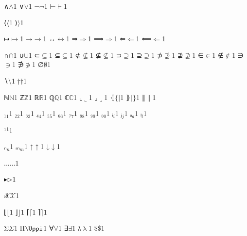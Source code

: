 {{∧}{{\ensuremath{\wedge}}}1
{∨}{{\ensuremath{\vee}}}1
{¬}{{\ensuremath{\neg}}}1
{⊢}{{\ensuremath{\vdash}}}1

{⟨}{{\ensuremath{\langle}}}1
{⟩}{{\ensuremath{\rangle}}}1

{↦}{{\ensuremath{\mapsto}}}1
{→}{{\ensuremath{\rightarrow}}}1
{↔}{{\ensuremath{\leftrightarrow}}}1
{⇒}{{\ensuremath{\Rightarrow}}}1
{⟹}{{\ensuremath{\Longrightarrow}}}1
{⇐}{{\ensuremath{\Leftarrow}}}1
{⟸}{{\ensuremath{\Longleftarrow}}}1

{∩}{{\ensuremath{\cap}}}1
{∪}{{\ensuremath{\cup}}}1
{⊂}{{\ensuremath{\subseteq}}}1
{⊆}{{\ensuremath{\subseteq}}}1
{⊄}{{\ensuremath{\nsubseteq}}}1
{⊈}{{\ensuremath{\nsubseteq}}}1
{⊃}{{\ensuremath{\supseteq}}}1
{⊇}{{\ensuremath{\supseteq}}}1
{⊅}{{\ensuremath{\nsupseteq}}}1
{⊉}{{\ensuremath{\nsupseteq}}}1
{∈}{{\ensuremath{\in}}}1
{∉}{{\ensuremath{\notin}}}1
{∋}{{\ensuremath{\ni}}}1
{∌}{{\ensuremath{\notni}}}1
{∅}{{\ensuremath{\emptyset}}}1

{∖}{{\ensuremath{\setminus}}}1
{†}{{\ensuremath{\dag}}}1

{ℕ}{{\ensuremath{\mathbb{N}}}}1
{ℤ}{{\ensuremath{\mathbb{Z}}}}1
{ℝ}{{\ensuremath{\mathbb{R}}}}1
{ℚ}{{\ensuremath{\mathbb{Q}}}}1
{ℂ}{{\ensuremath{\mathbb{C}}}}1
{⌞}{{\ensuremath{\llcorner}}}1
{⌟}{{\ensuremath{\lrcorner}}}1
{⦃}{{\ensuremath{\{\!|}}}1
{⦄}{{\ensuremath{|\!\}}}}1
{∥}{{\ensuremath{\|}}}1

{₁}{{\ensuremath{_1}}}1
{₂}{{\ensuremath{_2}}}1
{₃}{{\ensuremath{_3}}}1
{₄}{{\ensuremath{_4}}}1
{₅}{{\ensuremath{_5}}}1
{₆}{{\ensuremath{_6}}}1
{₇}{{\ensuremath{_7}}}1
{₈}{{\ensuremath{_8}}}1
{₉}{{\ensuremath{_9}}}1
{₀}{{\ensuremath{_0}}}1
{ᵢ}{{\ensuremath{_i}}}1
{ⱼ}{{\ensuremath{_j}}}1
{ₐ}{{\ensuremath{_a}}}1
{ₗ}{{\ensuremath{_l}}}1

{¹}{{\ensuremath{^1}}}1

{ₙ}{{\ensuremath{_n}}}1
{ₘ}{{\ensuremath{_m}}}1
{↑}{{\ensuremath{\uparrow}}}1
{↓}{{\ensuremath{\downarrow}}}1

{...}{{\ensuremath{\ldots}}}1

{▸}{{\ensuremath{\triangleright}}}1

{𝒳}{{\ensuremath{\mathcal{X}}}}1

{⌊}{{\ensuremath{\lfloor}}}1
{⌋}{{\ensuremath{\rfloor}}}1
{⌈}{{\ensuremath{\lceil}}}1
{⌉}{{\ensuremath{\rceil}}}1

{Σ}{{\color{symbolcolor}\ensuremath{\Sigma}}}1
{Π}{{\color{symbolcolor}\ensuremath{\mathrm{\Uppi}}}}1 %
{∀}{{\color{symbolcolor}\ensuremath{\forall}}}1
{∃}{{\color{symbolcolor}\ensuremath{\exists}}}1
{λ}{{\color{symbolcolor}\ensuremath{\mathrm{\uplambda}}}}1
{\$}{{\color{symbolcolor}\$}}1

}
